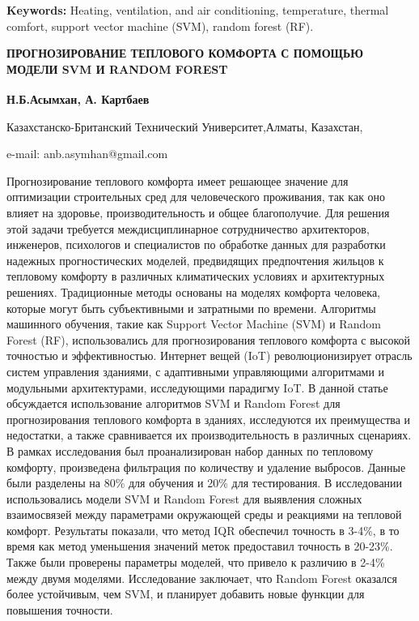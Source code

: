{\bfseries Keywords:} Heating, ventilation, and air conditioning,
temperature, thermal comfort, support vector machine (SVM), random
forest (RF).

\begin{articleheader}
{\bfseries ПРОГНОЗИРОВАНИЕ ТЕПЛОВОГО КОМФОРТА С ПОМОЩЬЮ МОДЕЛИ SVM И RANDOM
FOREST}
\end{articleheader}

\begin{affiliation}
{\bfseries Н.Б.Асымхан\textsuperscript{\envelope }, А. Картбаев}

Казахстанско-Британский Технический Университет,Алматы, Казахстан,

e-mail: anb.asymhan@gmail.com
\end{affiliation}

Прогнозирование теплового комфорта имеет решающее значение для
оптимизации строительных сред для человеческого проживания, так как оно
влияет на здоровье, производительность и общее благополучие. Для решения
этой задачи требуется междисциплинарное сотрудничество архитекторов,
инженеров, психологов и специалистов по обработке данных для разработки
надежных прогностических моделей, предвидящих предпочтения жильцов к
тепловому комфорту в различных климатических условиях и архитектурных
решениях. Традиционные методы основаны на моделях комфорта человека,
которые могут быть субъективными и затратными по времени. Алгоритмы
машинного обучения, такие как Support Vector Machine (SVM) и Random
Forest (RF), использовались для прогнозирования теплового комфорта с
высокой точностью и эффективностью. Интернет вещей (IoT)
революционизирует отрасль систем управления зданиями, с адаптивными
управляющими алгоритмами и модульными архитектурами, исследующими
парадигму IoT. В данной статье обсуждается использование алгоритмов SVM
и Random Forest для прогнозирования теплового комфорта в зданиях,
исследуются их преимущества и недостатки, а также сравнивается их
производительность в различных сценариях. В рамках исследования был
проанализирован набор данных по тепловому комфорту, произведена
фильтрация по количеству и удаление выбросов. Данные были разделены на
80\% для обучения и 20\% для тестирования. В исследовании использовались
модели SVM и Random Forest для выявления сложных взаимосвязей между
параметрами окружающей среды и реакциями на тепловой комфорт. Результаты
показали, что метод IQR обеспечил точность в 3-4\%, в то время как метод
уменьшения значений меток предоставил точность в 20-23\%. Также были
проверены параметры моделей, что привело к различию в 2-4\% между двумя
моделями. Исследование заключает, что Random Forest оказался более
устойчивым, чем SVM, и планирует добавить новые функции для повышения
точности.

